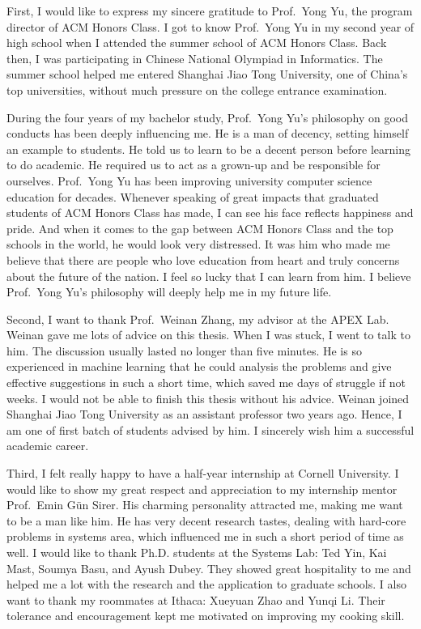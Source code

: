 
\begin{thanks}

    First, I would like to express my sincere gratitude to Prof.~Yong Yu,
    the program director of ACM Honors Class.
    I got to know Prof.~Yong Yu in my second year of high school
    when I attended the summer school of ACM Honors Class.
    Back then, I was participating in Chinese National Olympiad in Informatics.
    The summer school helped me entered Shanghai Jiao Tong University,
    one of China's top universities, without much pressure on the college entrance examination.

    During the four years of my bachelor study,
    Prof.~Yong Yu's philosophy on good conducts has been deeply influencing me.
    He is a man of decency, setting himself an example to students.
    He told us to learn to be a decent person before learning to do academic.
    He required us to act as a grown-up and be responsible for ourselves.
    Prof.~Yong Yu has been improving university computer science education for decades.
    Whenever speaking of great impacts that graduated students of ACM Honors Class has made,
    I can see his face reflects happiness and pride.
    And when it comes to the gap between ACM Honors Class and the top schools in the world,
    he would look very distressed.
    It was him who made me believe that there are people who love education from heart
    and truly concerns about the future of the nation.
    I feel so lucky that I can learn from him.
    I believe Prof.~Yong Yu's philosophy will deeply help me in my future life.

    Second, I want to thank Prof.~Weinan Zhang, my advisor at the APEX Lab.
    Weinan gave me lots of advice on this thesis.
    When I was stuck, I went to talk to him.
    The discussion usually lasted no longer than five minutes.
    He is so experienced in machine learning that he could analysis the problems
    and give effective suggestions in such a short time,
    which saved me days of struggle if not weeks.
    I would not be able to finish this thesis without his advice.
    Weinan joined Shanghai Jiao Tong University as an assistant professor two years ago.
    Hence, I am one of first batch of students advised by him.
    I sincerely wish him a successful academic career.

    Third, I felt really happy to have a half-year internship at Cornell University.
    I would like to show my great respect and appreciation to my internship mentor Prof.~Emin Gün Sirer.
    His charming personality attracted me, making me want to be a man like him.
    He has very decent research tastes, dealing with hard-core problems in systems area,
    which influenced me in such a short period of time as well.
    I would like to thank Ph.D. students at the Systems Lab: Ted Yin, Kai Mast, Soumya Basu, and Ayush Dubey.
    They showed great hospitality to me
    and helped me a lot with the research and the application to graduate schools.
    I also want to thank my roommates at Ithaca: Xueyuan Zhao and Yunqi Li.
    Their tolerance and encouragement kept me motivated on improving my cooking skill.


\end{thanks}
